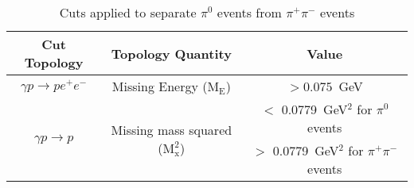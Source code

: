 \begin{table}[h!]
\begin{minipage}{\textwidth}
\begin{center}
\begin{singlespacing}

\caption[Cuts To Separate $\pi^0$ from $\pi^{+}\pi^{-}$ for \emph{PID} Validation]{\label{tab:lep_cuts}Cuts applied to separate $\pi^0$ events from $\pi^{+}\pi^{-}$ events \vspace{0.75mm}}

\begin{tabular}{c|c|c}

\hline
Cut Topology & Topology Quantity & Value  \\
\hline
$\gamma p \rightarrow p e^+ e^-$ & Missing Energy ($\mathrm{M_E}$) & $>0.075$~GeV \\
\hline
\multirow{2}{*}{$\gamma p \rightarrow p $}  & \multirow{2}{*}{Missing mass squared ($\mathrm{M_x^2}$)} & $<$ 0.0779~GeV$^2$ for $\pi^0$ events \\
&  & $>$ 0.0779~GeV$^2$ for $\pi^{+}\pi^{-}$ events\\
\hline \hline
\end{tabular}

\end{singlespacing}
\end{center}
\end{minipage}
\end{table}
